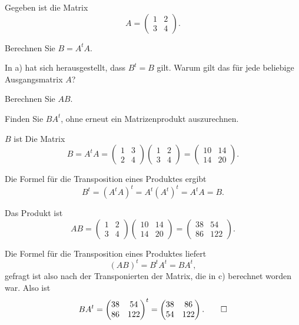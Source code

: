 Gegeben ist die Matrix
\[
A
=
\begin{pmatrix}1&2\\3&4\end{pmatrix}.
\]
\begin{teilaufgaben}
\item Berechnen Sie $B=A^tA$.
\item In a) hat sich herausgestellt, dass $B^t=B$ gilt.
Warum gilt das für jede beliebige Ausgangsmatrix $A$?
\item
Berechnen Sie $AB$.
\item
Finden Sie $BA^t$, ohne erneut ein Matrizenprodukt auszurechnen.
\end{teilaufgaben}

\begin{loesung}
\begin{teilaufgaben}
\item $B$ ist Die Matrix
\[
B=A^tA=
\begin{pmatrix}1&3\\2&4\end{pmatrix}
\begin{pmatrix}1&2\\3&4\end{pmatrix}
=
\begin{pmatrix}
10&14\\
14&20
\end{pmatrix}.
\]
\item Die Formel für die Transposition eines Produktes ergibt
\[
B^t
=
(A^tA)^t
=
A^t(A^t)^t
=
A^tA
=
B.
\]
\item
Das Produkt ist
\[
AB
=
\begin{pmatrix}1&2\\3&4\end{pmatrix}
\begin{pmatrix}
10&14\\
14&20
\end{pmatrix}
=
\begin{pmatrix}
38& 54\\
86&122
\end{pmatrix}.
\]
\item
Die Formel für die Transposition eines Produktes liefert
\[
(AB)^t = B^tA^t=BA^t,
\]
gefragt ist also nach der Transponierten der Matrix, die in c) berechnet
worden war.
Also ist
\[
BA^t
= 
\begin{pmatrix}
38& 54\\
86&122
\end{pmatrix}^t
=
\begin{pmatrix}
38& 86\\
54&122
\end{pmatrix}.
\qedhere
\]
\end{teilaufgaben}
\end{loesung}


